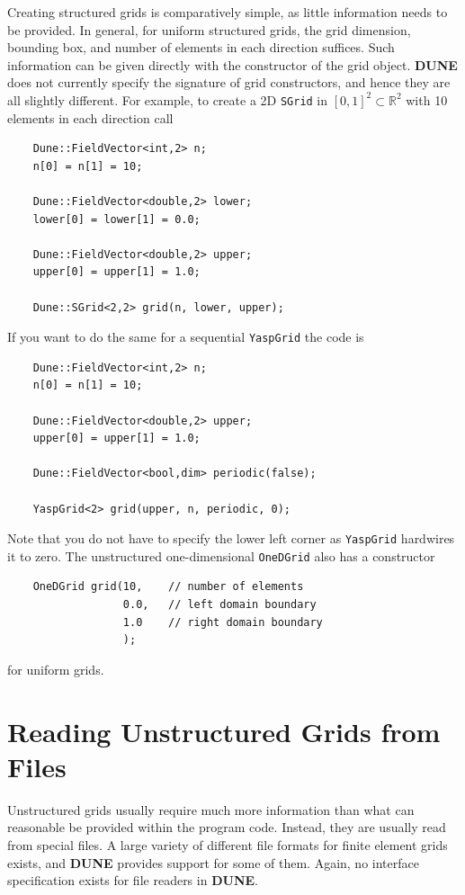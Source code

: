 \documentclass[11pt,a4paper,headinclude,footinclude,DIV16,normalheadings]{scrreprt}
\newcommand{\Dune}{{\sf\bfseries DUNE}\xspace}
\begin{document}
Creating structured grids is comparatively simple, as little information
needs to be provided.  In general, for uniform structured grids, the grid
dimension, bounding box, and number of elements in each direction suffices.
Such information can be given directly with the constructor of the grid
object. \Dune does not currently specify the signature of grid constructors,
and hence they are all slightly different.  For example, to create a 2D
\lstinline!SGrid! in $[0,1]^2 \subset \mathbb{R}^2$ with 10 elements in
each direction call
\begin{lstlisting}
    Dune::FieldVector<int,2> n;
    n[0] = n[1] = 10;

    Dune::FieldVector<double,2> lower;
    lower[0] = lower[1] = 0.0;

    Dune::FieldVector<double,2> upper;
    upper[0] = upper[1] = 1.0;

    Dune::SGrid<2,2> grid(n, lower, upper);
\end{lstlisting}
If you want to do the same for a sequential \lstinline!YaspGrid! the code is
\begin{lstlisting}
    Dune::FieldVector<int,2> n;
    n[0] = n[1] = 10;

    Dune::FieldVector<double,2> upper;
    upper[0] = upper[1] = 1.0;

    Dune::FieldVector<bool,dim> periodic(false);
    
    YaspGrid<2> grid(upper, n, periodic, 0);
\end{lstlisting}
Note that you do not have to specify the lower left corner as \lstinline!YaspGrid!
hardwires it to zero.  The unstructured one-dimensional \lstinline!OneDGrid!
also has a constructor
\begin{lstlisting}
    OneDGrid grid(10,    // number of elements 
                  0.0,   // left domain boundary
                  1.0    // right domain boundary
                  );
\end{lstlisting}
for uniform grids.

\section{Reading Unstructured Grids from Files}

Unstructured grids usually require much more information than what can
reasonable be provided within the program code.  Instead, they are usually
read from special files.  A large variety of different file formats for
finite element grids exists, and \Dune provides support for some of them.
Again, no interface specification exists for file readers in \Dune.
\end{document}
